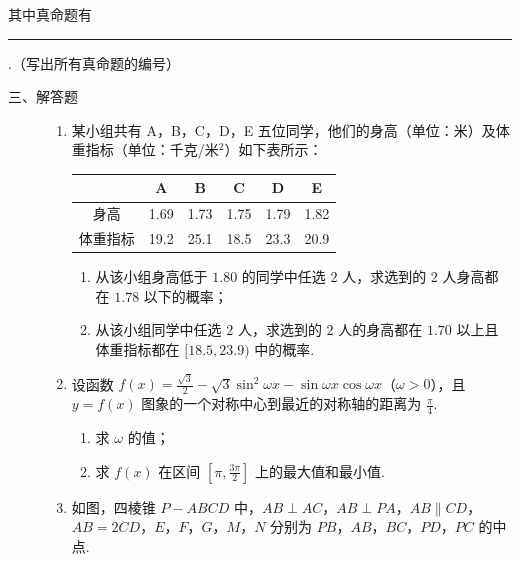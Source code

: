 \begin{description}
\begin{enumerate}[leftmargin=5pt]
其中真命题有\rule[-0.3ex]{3em}{0.4pt}.（写出所有真命题的编号）

    \end{enumerate}

\end{description}

\begin{description}

    \item[三、解答题]

    \begin{enumerate}[leftmargin=5pt]

      \addtocounter{enumi}{+16}

        \item 某小组共有 A，B，C，D，E 五位同学，他们的身高（单位：米）及体重指标（单位：千克/米\(^{2}\)）如下表所示：

\begin{center}
\begin{tabular}{|c|c|c|c|c|c|}
\hline
 & A & B & C & D & E \\
\hline
身高 & 1.69 & 1.73 & 1.75 & 1.79 & 1.82 \\
\hline
体重指标 & 19.2 & 25.1 & 18.5 & 23.3 & 20.9 \\
\hline
\end{tabular}
\end{center}

\begin{enumerate}
\item 从该小组身高低于 \(1.80\) 的同学中任选 \(2\) 人，求选到的 \(2\) 人身高都在 \(1.78\) 以下的概率；
\item 从该小组同学中任选 \(2\) 人，求选到的 \(2\) 人的身高都在 \(1.70\) 以上且体重指标都在 \([18.5, 23.9)\) 中的概率.
\end{enumerate}

        \item 设函数 \(f(x) = \frac{\sqrt{3}}{2} - \sqrt{3}\sin^2\omega x - \sin \omega x\cos \omega x \)（\(\omega > 0\)），且 \( y = f(x) \) 图象的一个对称中心到最近的对称轴的距离为 \( \frac{\pi}{4} \).

\begin{enumerate}
\item 求 \(\omega\) 的值；
\item 求 \( f(x) \) 在区间 \( \left[\pi, \frac{3\pi}{2}\right] \) 上的最大值和最小值.
\end{enumerate}

        \item 如图，四棱锥 \(P - ABCD\) 中，\(AB \perp AC\)，\(AB \perp PA\)，\(AB \parallel CD\)，\(AB = 2CD\)，\(E\)，\(F\)，\(G\)，\(M\)，\(N\) 分别为 \(PB\)，\(AB\)，\(BC\)，\(PD\)，\(PC\) 的中点.


\end{enumerate}
\end{description}
